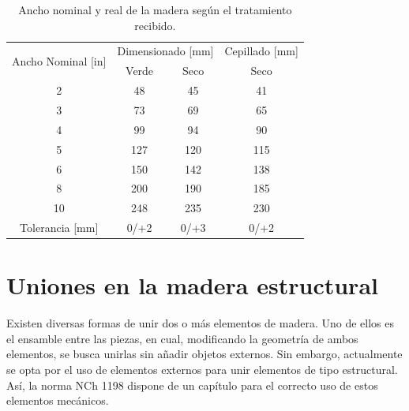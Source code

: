 \begin{table}[H]
\centering
\caption{Ancho nominal y real de la madera según el tratamiento recibido.}
\begin{tabular}{@{}cccc@{}}
\toprule
\multirow{2}{*}{Ancho Nominal {[}in{]}} & \multicolumn{2}{c}{Dimensionado {[}mm{]}} & Cepillado {[}mm{]} \\ \cmidrule(l){2-4} 
                                        & Verde                & Seco               & Seco               \\ \midrule
2                                       & 48                   & 45                 & 41                 \\
3                                       & 73                   & 69                 & 65                 \\
4                                       & 99                   & 94                 & 90                 \\
5                                       & 127                  & 120                & 115                \\
6                                       & 150                  & 142                & 138                \\
8                                       & 200                  & 190                & 185                \\
10                                      & 248                  & 235                & 230                \\ \midrule
Tolerancia {[}mm{]}                     & 0/+2                 & 0/+3               & 0/+2               \\ \bottomrule
\end{tabular}
\label{tab:anchodim}
\end{table}

\section{Uniones en la madera estructural}
Existen diversas formas de unir dos o más elementos de madera. Uno de ellos es el ensamble entre las piezas, en cual, modificando la geometría de ambos elementos, se busca unirlas sin añadir objetos externos. Sin embargo, actualmente se opta por el uso de elementos externos para unir elementos de tipo estructural. Así, la norma NCh 1198 dispone de un capítulo para el correcto uso de estos elementos mecánicos.
